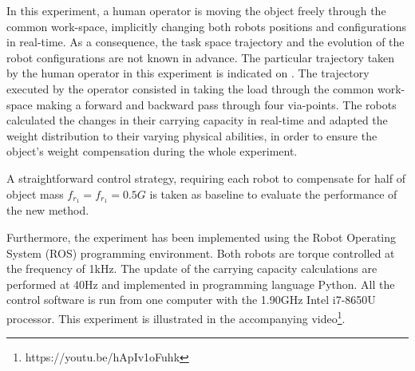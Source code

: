 In this experiment, a human operator is moving the object freely through the common work-space, implicitly changing both robots positions and configurations in real-time. As a consequence, the task space trajectory and the evolution of the robot configurations are not known in advance. The particular trajectory taken by the human operator in this experiment is indicated on . 
The trajectory executed by the operator consisted in taking the load through the common work-space making a forward and backward pass through four via-points. The robots calculated the changes in their carrying capacity in real-time and adapted the weight distribution to their varying physical abilities, in order to ensure the object's weight compensation during the whole experiment. 

A straightforward control strategy, requiring each robot to compensate for half of object mass $f_{r_1}=f_{r_1}=0.5G$ is taken as baseline to evaluate the performance of the new method.

Furthermore, the experiment has been implemented using the Robot Operating System (ROS) programming environment. Both robots are torque controlled at the frequency of 1kHz. The update of the carrying capacity calculations are performed at 40Hz and implemented in programming language Python. All the control software is run from one computer with the 1.90GHz Intel i7-8650U processor. 
This experiment is illustrated in the accompanying video\footnote{https://youtu.be/hApIv1oFuhk}.

